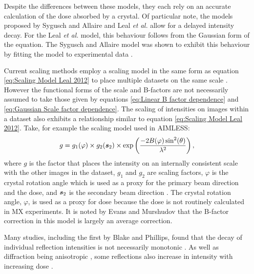 		Despite the differences between these models, they each rely on an accurate calculation of the dose absorbed by a crystal.
		Of particular note, the models proposed by Sygusch and Allaire and Leal \textit{et al.} allow for a delayed intensity decay.
		For the Leal \textit{et al.} model, this behaviour follows from the Gaussian form of the equation.
		The Sygusch and Allaire model was shown to exhibit this behaviour by fitting the model to experimental data \cite{owen2014}.

		Current scaling methods employ a scaling model in the same form as equation \ref{eq:Scaling Model Leal 2012} to place multiple datasets on the same scale \cite{kabsch2010integration}.
        However the functional forms of the scale and B-factors are not necessarily assumed to take those given by equations \ref{eq:Linear B factor dependence} and \ref{eq:Gaussian Scale factor dependence}.
		The scaling of intensities on images within a dataset also exhibits a relationship similar to equation \ref{eq:Scaling Model Leal 2012}. Take, for example the scaling model used in AIMLESS:
        \begin{equation}
            g = g_1(\varphi) \times g_2(\boldsymbol{s}_2) \times \exp \left(\frac{-2B(\varphi)\sin^2(\theta)}{\lambda^2} \right),
        \end{equation}
		where $g$ is the factor that places the intensity on an internally consistent scale with the other images in the dataset, $g_1$ and $g_2$ are scaling factors, $\varphi$ is the crystal rotation angle which is used as a proxy for the primary beam direction and the dose, and $\boldsymbol{s}_2$ is the secondary beam direction \cite{evans2013}.
		The crystal rotation angle, $\varphi$, is used as a proxy for dose because the dose is not routinely calculated in MX experiments. It is noted by Evans and Murshudov that the B-factor correction in this model is largely an average correction.

		Many studies, including the first by Blake and Phillips, found that the decay of individual reflection intensities is not necessarily monotonic \cite{blake1962,hendrickson1973,hendrickson1976}.
		As well as diffraction being anisotropic \cite{abrahams1987anisotropy}, some reflections also increase in intensity with increasing dose \cite{abrahams1973}.

